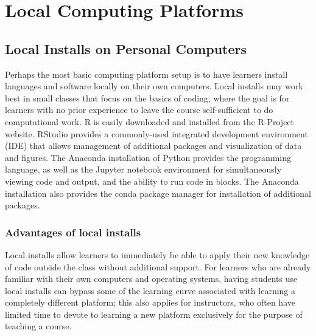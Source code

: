 

\section{Local Computing Platforms}

\subsection{Local Installs on Personal Computers}\label{subsect:Local Installs}

Perhaps the most basic computing platform setup is to have learners install languages and software locally on their own computers. 
Local installs may work best in small classes that focus on 
the basics of 
coding, where the goal is 
for learners with no prior experience
to leave the course self-sufficient to do computational work.
R is easily downloaded and installed from the R-Project website.
RStudio provides a commonly-used integrated development environment (IDE)
that allows management of additional packages and visualization of data and figures.
The Anaconda installation of Python provides the programming language,
as well as the Jupyter notebook environment for simultaneously viewing code and output,
and the ability to run code in blocks.
The Anaconda installation also provides the conda package manager for installation of additional packages.

\subsubsection{Advantages of local installs}

Local installs allow learners to immediately be able to apply their new knowledge of code outside the class without additional support. For learners who are already familiar with their own computers and operating systems, having students use local installs can bypass some of the learning curve associated with learning a completely different platform; this also applies for instructors, who often have limited time to devote to learning a new platform exclusively for the purpose of teaching a course.


